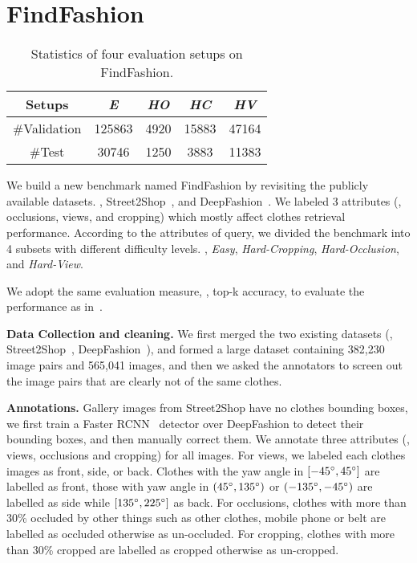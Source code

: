 \documentclass[10pt,twocolumn,letterpaper]{article}
\begin{document}
\section{FindFashion}
\begin{table}
\center
\begin{center}
\begin{tabular}{c|c|c|c|c}
\hline
Setups & \textit{E}  &  \textit{HO} & \textit{HC} & \textit{HV} \\ \hline
\#Validation& 125863   & 4920    & 15883      & 47164 \\ \hline
\#Test & 30746   & 1250    & 3883      & 11383 \\ \hline
\end{tabular}
\end{center}
\caption{Statistics of four evaluation setups on FindFashion.}
\label{tab:table_benchmark}
\end{table}

We build a new benchmark named FindFashion by revisiting the publicly available datasets. \ie, Street2Shop~\cite{Kiapour2015}, and DeepFashion~\cite{Liu2016}. We labeled 3 attributes (\ie, occlusions, views, and cropping) which mostly affect clothes retrieval performance.
According to the attributes of query, we divided the benchmark into 4 subsets with different difficulty levels. \ie, \textit{Easy}, \textit{Hard-Cropping}, \textit{Hard-Occlusion}, and \textit{Hard-View}.

We adopt the same evaluation measure, \ie, top-k accuracy, to evaluate the performance as in~\cite{Kiapour2015,Liu2016}.

\textbf{Data Collection and cleaning.}
We first merged the two existing datasets (\ie, Street2Shop~\cite{Kiapour2015}, DeepFashion~\cite{Liu2016}), and formed a large dataset containing 382,230 image pairs and 565,041 images, and then we asked the annotators to screen out the image pairs that are clearly not of the same clothes.

\textbf{Annotations.} Gallery images from Street2Shop have no clothes bounding boxes, we first train a Faster RCNN~\cite{ren2015faster} detector over DeepFashion to detect their bounding boxes, and then manually correct them. We annotate three attributes (\ie, views, occlusions and cropping) for all images.
For views, we labeled each clothes images as front, side, or back.  Clothes with the yaw angle in $[-45\degree,45\degree]$ are labelled as front,  those with yaw angle in  $(45\degree,135\degree)$ or $(-135\degree,-45\degree)$ are labelled as side while $[135\degree,225\degree]$  as back. For occlusions, clothes with more than 30\% occluded by other things such as other clothes, mobile phone or belt are labelled as occluded otherwise as un-occluded. For cropping, clothes with more than 30\% cropped are labelled as cropped otherwise as un-cropped.
\end{document}
